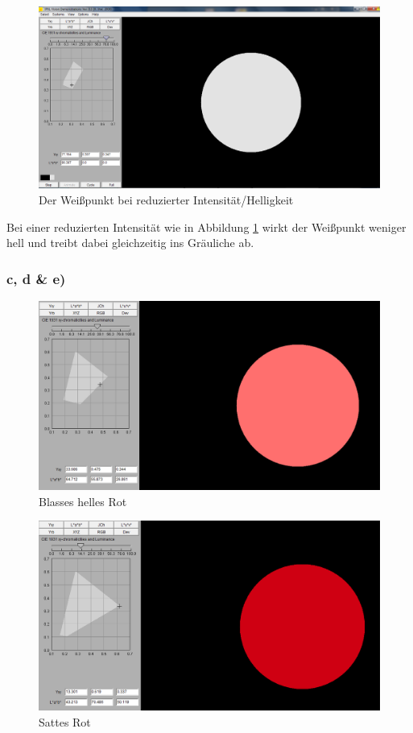 \documentclass[a4paper]{article}
\begin{document}
\begin{figure}[H]
    \centering
    \includegraphics[width=0.8\columnwidth]{images/A4_b_Veraenderung_der_Intensitaet}
    \caption{Der Weißpunkt bei reduzierter Intensität/Helligkeit}
    \label{fig:A3b}
\end{figure}

Bei einer reduzierten Intensität wie in Abbildung \ref{fig:A3b} wirkt der Weißpunkt weniger hell und treibt dabei gleichzeitig ins Gräuliche ab.

\newpage
\subsubsection*{c, d \& e)}

\begin{figure}[H]
    \centering
    \includegraphics[width=0.7\columnwidth]{images/A4_cde_BlassesHellesRot.PNG}
    \caption{Blasses helles Rot}
    \label{fig:A4cde1}
\end{figure}

\begin{figure}[H]
    \centering
    \includegraphics[width=0.7\columnwidth]{images/A4_cde_SattesRot.PNG}
    \caption{Sattes Rot}
    \label{fig:A4cde2}
\end{figure}
\end{document}
